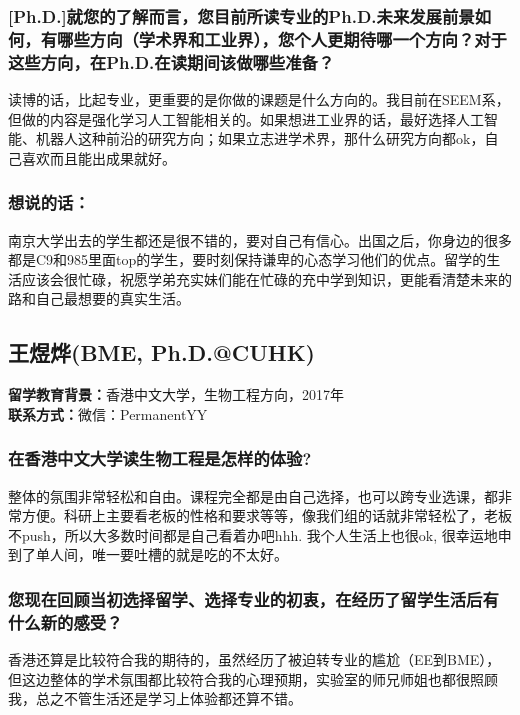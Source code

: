 \documentclass[a4paper,UTF8]{book}
\begin{document}
    \subsubsection*{[Ph.D.]就您的了解而言，您目前所读专业的Ph.D.未来发展前景如何，有哪些方向（学术界和工业界），您个人更期待哪一个方向？对于这些方向，在Ph.D.在读期间该做哪些准备？}
    读博的话，比起专业，更重要的是你做的课题是什么方向的。我目前在SEEM系，但做的内容是强化学习人工智能相关的。如果想进工业界的话，最好选择人工智能、机器人这种前沿的研究方向；如果立志进学术界，那什么研究方向都ok，自己喜欢而且能出成果就好。
                    
    \subsubsection{想说的话：}
    南京大学出去的学生都还是很不错的，要对自己有信心。出国之后，你身边的很多都是C9和985里面top的学生，要时刻保持谦卑的心态学习他们的优点。留学的生活应该会很忙碌，祝愿学弟充实妹们能在忙碌的充中学到知识，更能看清楚未来的路和自己最想要的真实生活。
        

    
\clearpage
\subsection{王煜烨(BME, Ph.D.@CUHK)}
    \textbf{留学教育背景：}香港中文大学，生物工程方向，2017年\\
    \textbf{联系方式：}微信：PermanentYY

    \subsubsection*{在香港中文大学读生物工程是怎样的体验?}
    整体的氛围非常轻松和自由。课程完全都是由自己选择，也可以跨专业选课，都非常方便。科研上主要看老板的性格和要求等等，像我们组的话就非常轻松了，老板不push，所以大多数时间都是自己看着办吧hhh. 我个人生活上也很ok, 很幸运地申到了单人间，唯一要吐槽的就是吃的不太好。

    \subsubsection*{您现在回顾当初选择留学、选择专业的初衷，在经历了留学生活后有什么新的感受？}
    香港还算是比较符合我的期待的，虽然经历了被迫转专业的尴尬（EE到BME），但这边整体的学术氛围都比较符合我的心理预期，实验室的师兄师姐也都很照顾我，总之不管生活还是学习上体验都还算不错。
\end{document}
